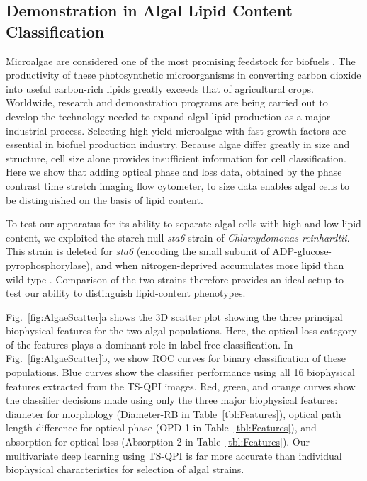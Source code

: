 \documentclass[aps,pra,reprint,superscriptaddress]{revtex4-1}
\begin{document}
\subsection*{Demonstration in Algal Lipid Content Classification}

Microalgae are considered one of the most promising feedstock for biofuels \cite{merchant2012tag}. The productivity of these photosynthetic microorganisms in converting carbon dioxide into useful carbon-rich lipids greatly exceeds that of agricultural crops. Worldwide, research and demonstration programs are being carried out to develop the technology needed to expand algal lipid production as a major industrial process. Selecting high-yield microalgae with fast growth factors are essential in biofuel production industry. Because algae differ greatly in size and structure, cell size alone provides insufficient information for cell classification. Here we show that adding optical phase and loss data, obtained by the phase contrast time stretch imaging flow cytometer, to size data enables algal cells to be distinguished on the basis of lipid content. 

To test our apparatus for its ability to separate algal cells with high and low-lipid content, we exploited the starch-null \textit{sta6} strain of \textit{Chlamydomonas reinhardtii}. This strain is deleted for \textit{sta6} \cite{zabawinski2001starchless} (encoding the small subunit of ADP-glucose-pyrophosphorylase), and when nitrogen-deprived accumulates more lipid than wild-type \cite{work2010increased, li2010chlamydomonas, goodenough2014path, blaby2013systems}. Comparison of the two strains therefore provides an ideal setup to test our ability to distinguish lipid-content phenotypes.

Fig.~\ref{fig:AlgaeScatter}a shows the 3D scatter plot showing the three principal biophysical features for the two algal populations. Here, the optical loss category of the features plays a dominant role in label-free classification. In Fig.~\ref{fig:AlgaeScatter}b, we show ROC curves for binary classification of these populations. Blue curves show the classifier performance using all 16 biophysical features extracted from the TS-QPI images. Red, green, and orange curves show the classifier decisions made using only the three major biophysical features: diameter for morphology (Diameter-RB in Table~\ref{tbl:Features}), optical path length difference for optical phase (OPD-1 in Table~\ref{tbl:Features}), and absorption for optical loss (Absorption-2 in Table~\ref{tbl:Features}). Our multivariate deep learning using TS-QPI is far more accurate than individual biophysical characteristics for selection of algal strains.
\end{document}
